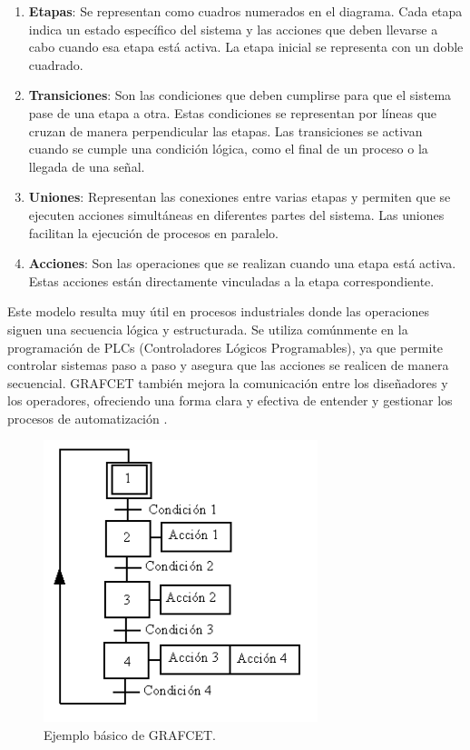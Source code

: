 \begin{enumerate}
    \item \textbf{Etapas}: Se representan como cuadros numerados en el diagrama. Cada etapa indica un estado específico del sistema y las acciones que deben llevarse a cabo cuando esa etapa está activa. La etapa inicial se representa con un doble cuadrado.
    \item \textbf{Transiciones}: Son las condiciones que deben cumplirse para que el sistema pase de una etapa a otra. Estas condiciones se representan por líneas que cruzan de manera perpendicular las etapas. Las transiciones se activan cuando se cumple una condición lógica, como el final de un proceso o la llegada de una señal.
    \item \textbf{Uniones}: Representan las conexiones entre varias etapas y permiten que se ejecuten acciones simultáneas en diferentes partes del sistema. Las uniones facilitan la ejecución de procesos en paralelo.
    \item \textbf{Acciones}: Son las operaciones que se realizan cuando una etapa está activa. Estas acciones están directamente vinculadas a la etapa correspondiente.
\end{enumerate}
    
Este modelo resulta muy útil en procesos industriales donde las operaciones siguen una secuencia lógica y estructurada. Se utiliza comúnmente en la programación de PLCs (Controladores Lógicos Programables), ya que permite controlar sistemas paso a paso y asegura que las acciones se realicen de manera secuencial. GRAFCET también mejora la comunicación entre los diseñadores y los operadores, ofreciendo una forma clara y efectiva de entender y gestionar los procesos de automatización \cite{grafcet_info}.

\begin{figure} [h!]
  \begin{center}
    \includegraphics[width=8cm]{figs/grafcet_def}
  \end{center}
  \caption{\centering Ejemplo básico de GRAFCET.}
  \label{fig:grafcet_def}
\end{figure} 

